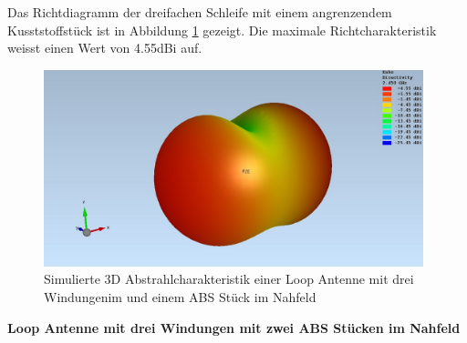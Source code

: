 Das Richtdiagramm der dreifachen Schleife mit einem angrenzendem Kusststoffstück ist in Abbildung \ref{fig:sim_Loop_3Fach_1ABS_3D} gezeigt. Die maximale Richtcharakteristik weisst einen Wert von 4.55dBi auf.
\begin{figure}[h]
	\centering
	\includegraphics[width=11cm]{content/bilder/Evaluation/Loop/Mit1ABS/EM_Far_Filed_Loop_Coil_1ABS.JPG}%
	\caption{Simulierte 3D Abstrahlcharakteristik einer Loop Antenne mit  drei Windungenim und einem ABS Stück im Nahfeld}
	\label{fig:sim_Loop_3Fach_1ABS_3D}
\end{figure}
\newpage
\textbf{Loop Antenne mit drei Windungen mit zwei ABS Stücken im Nahfeld}\\

